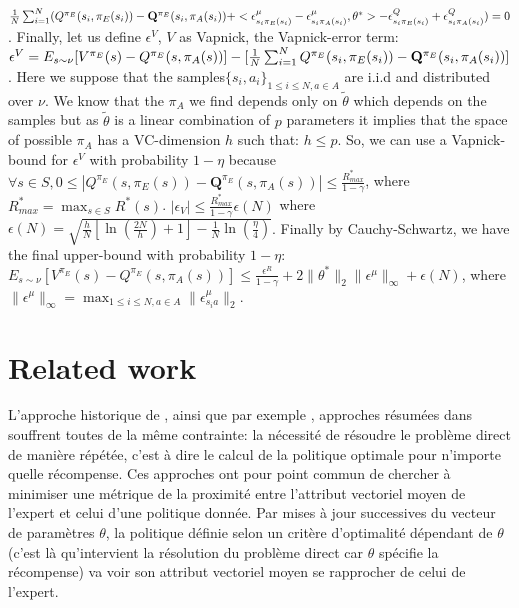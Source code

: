 \documentclass{article}
\newcommand{\Q}{\mathbf{Q}}
\begin{document}
${1\over N}\sum_{i=1}^N(Q^{\pi_E}(s_i,\pi_E(s_i))-\Q^{\pi_E}(s_i,\pi_A(s_i))+<\epsilon^{\mu}_{s_i\pi_E(s_i)}-\epsilon^{\mu}_{s_i\pi_A(s_i)},\theta^*>-\epsilon^{Q}_{s_i\pi_E(s_i)}+\epsilon^{Q}_{s_i\pi_A(s_i)})=0$. Finally, let us define $\epsilon^V$, $V$ as Vapnick, the Vapnick-error term:
$\epsilon^V=E_{s\sim\nu}[V^{\pi_E}(s)-Q^{\pi_E}(s,\pi_A(s))]-[{1\over N}\sum_{i=1}^NQ^{\pi_E}(s_i,\pi_E(s_i))-\Q^{\pi_E}(s_i,\pi_A(s_i))]$. Here we suppose that the samples$\{s_i,a_i\}_{1\leq i \leq N,a\in A}$ are i.i.d and distributed over $\nu$. We know that the $\pi_A$ we find depends only on $\tilde{\theta}$ which depends on the samples
but as $\tilde{\theta}$ is a linear combination of $p$ parameters it implies that the space of possible $\pi_A$ has a VC-dimension $h$ such that: $h\leq p$. So, we can use a Vapnick-bound for $\epsilon^V$ with probability $1-\eta$ because $\forall s\in S, 0\leq|Q^{\pi_E}(s,\pi_E(s))-\Q^{\pi_E}(s,\pi_A(s))|\leq\frac{R^*_{max}}{1-\gamma}$, where $R^*_{max}=\max_{s\in S}R^*(s)$. 
$|\epsilon_V|\leq\frac{R^*_{max}}{1-\gamma}\epsilon(N)$ where $\epsilon(N)=\sqrt{\frac{h}{N}[\ln(\frac{2N}{h})+1]-\frac{1}{N}\ln(\frac{\eta}{4})}$. Finally by Cauchy-Schwartz, we have the final upper-bound with probability $1-\eta$:
$E_{s\sim\nu}[V^{\pi_E}(s)-Q^{\pi_E}(s,\pi_A(s))]\leq\frac{\epsilon^R}{1-\gamma}+2\|\theta^*\|_2\|\epsilon^{\mu}\|_{\infty}+\epsilon(N)$, where $\|\epsilon^{\mu}\|_{\infty}=\max_{1\leq i\leq N,a\in A}\|\epsilon^{\mu}_{s_ia}\|_2$. 
\section{Related work}
\label{biblio.sec}
L'approche historique de \cite{ng2000algorithms}, ainsi que par exemple \cite{abbeel2004apprenticeship,syed2008apprenticeship,syed2008game, ziebart2008maximum}, approches résumées dans \cite{neu2009training} souffrent toutes de la même contrainte: la nécessité de résoudre le problème direct de manière répétée, c'est à dire le calcul de la politique optimale pour n'importe quelle récompense. Ces approches ont pour point commun de chercher à minimiser une métrique de la proximité entre l'attribut vectoriel moyen de \mbox{l'expert} et celui d'une politique donnée. Par mises à jour successives du vecteur de paramètres $\theta$, la politique définie selon un critère d'optimalité dépendant de $\theta$ (c'est là qu'intervient la résolution du problème direct car $\theta$ spécifie la récompense) va voir son attribut vectoriel moyen se rapprocher de celui de l'expert.\\
\end{document}
